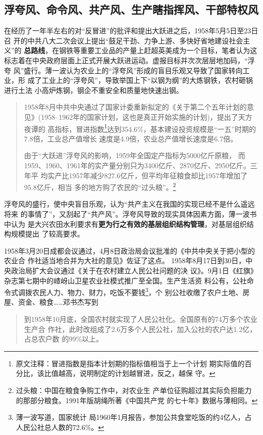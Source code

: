 \subsection{浮夸风、命令风、共产风、生产瞎指挥风、干部特权风}

在经历了一年半左右的对“反冒进”的批评和提出大跃进之后，1958年5月5日至23日召
开的中共八大二次会议上提出“鼓足干劲、力争上游、多快好省地建设社会主义”的
\textbf{总路线}，在钢铁等重要工业品的产量上赶超英美成为一个目标，笔者认为这
标志着在中央政府层面上正式开展大跃进运动。虚报目标并次次层层地加码，“浮夸
风”盛行。薄一波认为农业上的“浮夸风”形成的盲目乐观又导致了国家转向工业，形
成了工业上的“浮夸风”，导致举国上下“以钢为纲”的大炼钢铁，农村砸锅进行土法
小高炉炼钢，钢企不重安全和质量地快速出钢。

\begin{quotation}
  1958年8月中共中央通过了国家计委重新拟定的《关于第二个五年计划的意
  见》(1958--1962年的国家计划，这也是真正开始实施的计划)，提出了天方夜谭的
  高指标，冒进指数\footnote{原文注释：冒进指数是指本计划期的指标值相当于上一个计划
    期实际值的百分比，该比值越高，说明制定的计划越冒进，反之，越保
    守。}达到354.6\%，基本建设投资规模是“一五”时期的7.8倍，工业总产值增长
  速度是4.9倍，农业总产值增长速度是6.7倍。\cite{shiyiwu}

  由于“大跃进”浮夸风的影响，1959年全国定产指标为5000亿斤原粮，
  而1959、1960、1961年的实产量分别只为3400亿斤、2870亿斤、2950亿斤。三年平
  均实产比1957年减少827.6亿斤，但平均年征粮食却比1957年增加了95.8亿斤，相当
  多的地方购了农民的“过头粮”。\footnote{过头粮：中国在粮食争购工作中，对农业生
    产单位征购超过其实际负担能力的那部分粮食。1991年版胡绳所著《中国共产党
    的七十年》数据与薄相同。}\cite[278]{boyibo}
\end{quotation}


浮夸风的盛行，使中央盲目乐观，认为“共产主义在我国的实现已经不是什么遥远将来
的事情了”，又刮起了“共产风”。浮夸风导致的现实具体因素方面，薄一波书中认为
是大兴农田水利要求有\textbf{更为行之有效的基层组织结构管理}，对基层组织结构规模提出
了较高要求。

1958年3月20日成都会议通过，4月8日政治局会议批准的《中共中央关于把小型的农业合
作社适当地合并为大社的意见》佐证了这点。\cite[728-730]{boyibo}
1958年8月17日到30日，中央政治局扩大会议通过《关于在农村建立人民公社问题的决
议》。9月1日《红旗》杂志第七期中的嵖岈山卫星农业社模式推广至全国。生产生活资
料公有，公社命令式调拨农民人力、物力、财力，吃饭不要钱\footnote{薄一波写道，国家统计
  局1960年1月报告，参加公共食堂吃饭的约4亿人，占人民公社总人数的72.6\%。}，个
别公社收缴了农户土地、房屋、资金、粮食……邓书杰写到
\begin{quotation}
  到1958年10月底，全国农村就实现了人民公社化。全国原有的74万多个农业生产合
  作社，此时改组成了2.6万多个人民公社，加入公社的农户达1.2亿，占总农户数
  的99\%以上。
\end{quotation}

